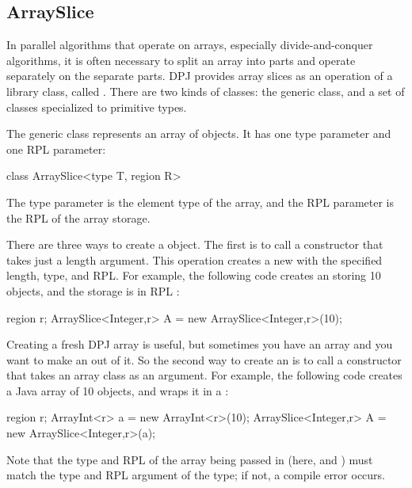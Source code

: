 \subsection{ArraySlice%
\label{sec:runtime:array-slice}}

In parallel algorithms that operate on arrays, especially
divide-and-conquer algorithms, it is often necessary to split an array
into parts and operate separately on the separate parts.  DPJ provides
array slices as an operation of a library class, called
.  There are two kinds of  classes:
the generic  class, and a set of 
classes specialized to primitive types.

 The generic  class
represents an array of objects.  It has one type parameter and one RPL
parameter:
%
\begin{dpjlisting}
class ArraySlice<type T, region R>
\end{dpjlisting}
%
The type parameter is the element type of the array, and the RPL
parameter is the RPL of the array storage.

 There are three ways to create a
 object.  The first is to call a constructor that
takes just a length argument.  This operation creates a new
 with the specified length, type, and RPL.  For
example, the following code creates an  storing 10
 objects, and the storage is in RPL :
%
\begin{dpjlisting}
region r;
ArraySlice<Integer,r> A = new ArraySlice<Integer,r>(10);
\end{dpjlisting}
%

Creating a fresh DPJ array is useful, but sometimes you have an array
and you want to make an  out of it.  So the second way
to create an  is to call a constructor that takes an
array class as an argument.  For example, the following code creates a
Java array of 10  objects, and wraps it in a
:
%
\begin{dpjlisting}
region r;
ArrayInt<r> a = new ArrayInt<r>(10);
ArraySlice<Integer,r> A = new ArraySlice<Integer,r>(a);
\end{dpjlisting}
%
Note that the type and RPL of the array being passed in (here,
 and ) must match the type and RPL argument of the
 type; if not, a compile error occurs.

